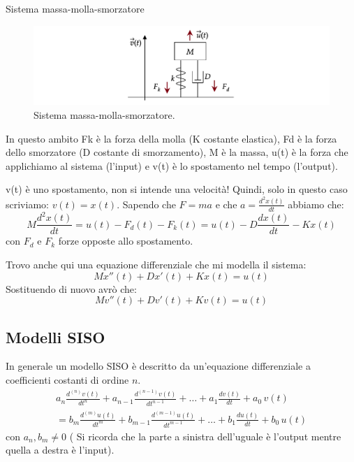 \begin{nexample}
	\label{es_mms}
	Sistema massa-molla-smorzatore 
	
		\begin{figure}[H]
			\centering
			\includegraphics{immagini/cap3_Sistemi/massa_molla_smorzatore}
			\caption{ Sistema massa-molla-smorzatore. }
			\label{fig: massa_molla_smorzatore}
		\end{figure}
		
		In questo ambito Fk è la forza della molla (K costante elastica), Fd è la forza dello smorzatore (D costante di smorzamento), M è la massa, u(t) è la forza che applichiamo al sistema (l'input) e v(t) è lo spostamento nel tempo (l'output).
		
		\begin{NB}
			 v(t) è uno spostamento, non si intende una velocità! Quindi, solo in questo caso scriviamo: $ v(t) = x(t) $.
			Sapendo che $ F=ma $ e che $a= \frac{d^2 x(t)}{dt} $ abbiamo che:
			\[  M \frac{d^2 x(t)}{dt} = u(t) - F_d(t) - F_k(t) = u(t) - D \frac{d x(t)}{dt} - K x(t) \]
			con $ F_d $ e $ F_k $ forze opposte allo spostamento.
		\end{NB}
		
		Trovo anche qui una equazione differenziale che mi modella il sistema:
		\[  M x''(t) + D x'(t) + K x(t) = u(t) \]
		Sostituendo di nuovo avrò che:
		\[ M v''(t) + D v'(t) + K v(t) = u(t) \]
\end{nexample}


\subsection{Modelli SISO}

	In generale un modello SISO è descritto da un'equazione differenziale a coefficienti costanti di ordine $ n $.
	\begin{multline}
		a_n \frac{d^{(n)} v(t)}{dt^n} 
			+ a_{n-1} \frac{d^{(n-1)} v(t)}{dt^{n-1}} 
			+ \dots 
			+ a_1 \frac{dv(t)}{dt} 
			+ a_0\,v(t)\\
		= b_m \frac{d^{(m)} u(t)}{dt^m}
			+ b_{m-1} \frac{d^{(m-1)} u(t)}{dt^{m-1}} 
			+ \dots
			+ b_1 \frac{du(t)}{dt} 
			+ b_0\,u(t)
	\tag{2}\label{equation 2}
	\end{multline}
	con $ a_n, b_m \ne 0 $ ( Si ricorda che la parte a sinistra dell'uguale è l'output mentre quella a destra è l'input).
	
